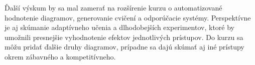 Ďalší výskum by sa mal zamerať na rozšírenie kurzu o automatizované hodnotenie diagramov, generovanie cvičení a odporúčacie systémy. Perspektívne je aj skúmanie adaptívneho učenia a dlhodobejších experimentov, ktoré by umožnili presnejšie vyhodnotenie efektov jednotlivých prístupov. Do kurzu sa môžu pridať ďalšie druhy diagramov, prípadne sa dajú skúmať aj iné prístupy okrem zábavného a kompetitívneho.




